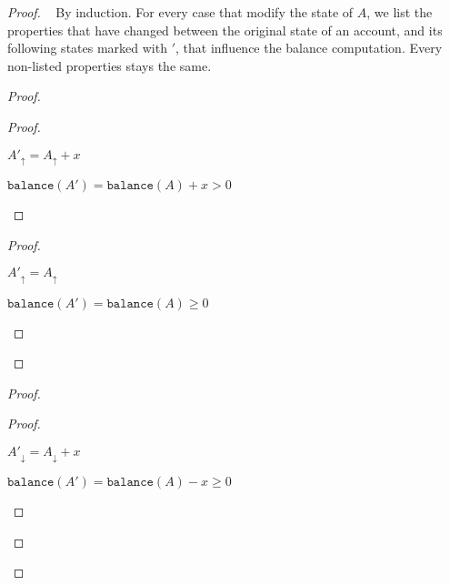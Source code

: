 \documentclass[9pt, oneside]{article}   	%
\begin{document}
\begin{proof}
\pfsketch~ By induction.
	For every case that modify the state of $A$, we list the properties that have changed between the original state of an account, and its following states marked with $'$, that influence the balance computation. Every non-listed properties stays the same.
		
	\begin{proof}
		\begin{proof}
			\begin{pfenum}
				\item $A'_\uparrow = A_\uparrow + x$
				\item $\texttt{balance}(A') = \texttt{balance}(A) + x > 0$
			\end{pfenum}
		\end{proof}
		
		\begin{proof}
			\begin{pfenum}
				\item $A'_\uparrow = A_\uparrow$
				\item $\texttt{balance}(A') = \texttt{balance}(A) \geq 0$
			\end{pfenum}
		\end{proof}		
	\end{proof}
	
	\begin{proof}
		\begin{proof}
			\begin{pfenum}
				\item $A'_\downarrow = A_\downarrow + x$
				\item $\texttt{balance}(A') = \texttt{balance}(A) - x \geq 0$
			\end{pfenum}
		\end{proof}
		

\end{proof}
\end{proof}
\end{document}
